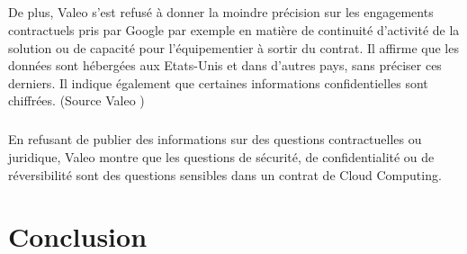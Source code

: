 \documentclass[a4paper,12pt]{report}
\begin{document}
\begin{onehalfspace}
	\paragraph*{}
	De plus, Valeo s'est refusé à donner la moindre précision sur les engagements contractuels pris par Google par exemple en matière de continuité d'activité de la solution ou de capacité pour l'équipementier à sortir du contrat. Il affirme que les données sont hébergées aux Etats-Unis et dans d’autres pays, sans préciser ces derniers. Il indique également que certaines informations confidentielles sont chiffrées. (Source Valeo \cite{source:valeo})
	\paragraph*{}
	En refusant de publier des informations sur des questions contractuelles ou juridique, Valeo montre que les questions de sécurité, de confidentialité ou de réversibilité sont des questions sensibles dans un contrat de Cloud Computing.
	


	\chapter*{Conclusion}
	
	
	\tableofcontents
	

\end{onehalfspace}
\end{document}
